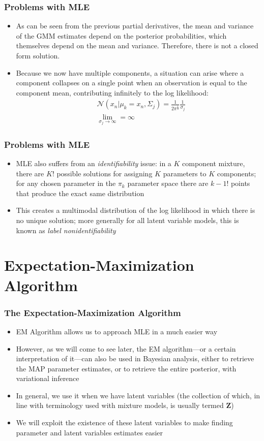\documentclass{beamer}
\begin{document}
\begin{frame}
\frametitle{Problems with MLE}
\begin{itemize}
	\item As can be seen from the previous partial derivatives, the mean and variance of the GMM estimates depend on the posterior probabilities, which themselves depend on the mean and variance. Therefore, there is not a closed form solution.
	\item Because we now have multiple components, a situation can arise where a component collapses on a single point when an observation is equal to the component mean, contributing infinitely to the log likelihood:
	\begin{align*}
	&\mathcal{N}(x_n|\mu_k = x_n, \Sigma_j) = \frac{1}{2\pi^{\frac{1}{2}}}\frac{1}{\sigma_j}\\ 
	&\lim_{\sigma_j \to \infty} = \infty
	\end{align*}
\end{itemize}

\end{frame}

\begin{frame}
\frametitle{Problems with MLE}
	\begin{itemize}
		\item MLE also suffers from an \textit{identifiability} issue: in a $K$ component mixture, there are $K!$ possible solutions for assigning $K$ parameters to $K$ components; for any chosen parameter in the $\pi_k$ parameter space there are $k-1!$ points that produce the exact same distribution
		\item This creates a multimodal distribution of the log likelihood in which there is no unique solution; more generally for all latent variable models, this is known as \textit{label nonidentifiability}
	\end{itemize}
\end{frame}

\section{Expectation-Maximization Algorithm}

\begin{frame}
\frametitle{The Expectation-Maximization Algorithm}
	\begin{itemize}
		\item EM Algorithm allows us to approach MLE in a much easier way
		\item However, as we will come to see later, the EM algorithm---or a certain interpretation of it---can also be used in Bayesian analysis, either to retrieve the MAP parameter estimates, or to retrieve the entire posterior, with variational inference
		\item In general, we use it when we have latent variables (the collection of which, in line with terminology used with mixture models, is usually termed $\mathbf{Z}$)
		\item We will exploit the existence of these latent variables to make finding parameter and latent variables estimates easier
	\end{itemize}
\end{frame}
\end{document}
